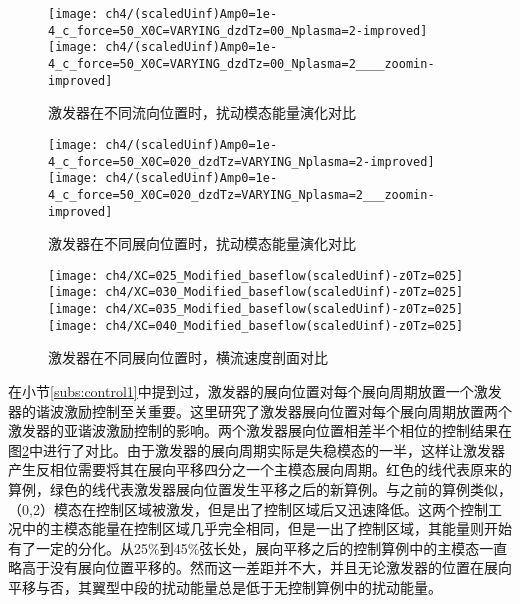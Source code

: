 \begin{figure}
\centering
\texttt{[image: ch4/(scaledUinf)Amp0=1e-4\_c\_force=50\_X0C=VARYING\_dzdTz=00\_Nplasma=2-improved]}
\texttt{[image: ch4/(scaledUinf)Amp0=1e-4\_c\_force=50\_X0C=VARYING\_dzdTz=00\_Nplasma=2\_\_\_\_zoomin-improved]}
\caption{激发器在不同流向位置时，扰动模态能量演化对比}%
\label{f:streamwiselocationeffect}
\end{figure}
\begin{figure}
\centering
\texttt{[image: ch4/(scaledUinf)Amp0=1e-4\_c\_force=50\_X0C=020\_dzdTz=VARYING\_Nplasma=2-improved]}
\texttt{[image: ch4/(scaledUinf)Amp0=1e-4\_c\_force=50\_X0C=020\_dzdTz=VARYING\_Nplasma=2\_\_\_zoomin-improved]}
\caption{激发器在不同展向位置时，扰动模态能量演化对比}%
\label{f:spanwiselocationeffect}
\end{figure}
\begin{figure}
\centering
\texttt{[image: ch4/XC=025\_Modified\_baseflow(scaledUinf)-z0Tz=025]}
\texttt{[image: ch4/XC=030\_Modified\_baseflow(scaledUinf)-z0Tz=025]}
\texttt{[image: ch4/XC=035\_Modified\_baseflow(scaledUinf)-z0Tz=025]}
\texttt{[image: ch4/XC=040\_Modified\_baseflow(scaledUinf)-z0Tz=025]}
\caption{激发器在不同展向位置时，横流速度剖面对比}%
\label{f:Wt_SpVar}
\end{figure}

在小节\ref{subs:control1}中提到过，激发器的展向位置对每个展向周期放置一个激发器的谐波激励控制至关重要。这里研究了激发器展向位置对每个展向周期放置两个激发器的亚谐波激励控制的影响。两个激发器展向位置相差半个相位的控制结果在图\ref{f:spanwiselocationeffect}中进行了对比。由于激发器的展向周期实际是失稳模态的一半，这样让激发器产生反相位需要将其在展向平移四分之一个主模态展向周期。红色的线代表原来的算例，绿色的线代表激发器展向位置发生平移之后的新算例。与之前的算例类似，（0,2）模态在控制区域被激发，但是出了控制区域后又迅速降低。这两个控制工况中的主模态能量在控制区域几乎完全相同，但是一出了控制区域，其能量则开始有了一定的分化。从25\%到45\%弦长处，展向平移之后的控制算例中的主模态一直略高于没有展向位置平移的。然而这一差距并不大，并且无论激发器的位置在展向平移与否，其翼型中段的扰动能量总是低于无控制算例中的扰动能量。

